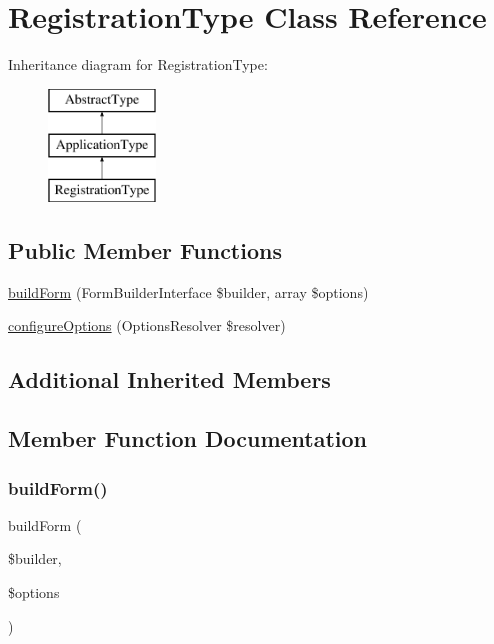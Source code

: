 \hypertarget{class_app_1_1_form_1_1_registration_type}{}\section{Registration\+Type Class Reference}
\label{class_app_1_1_form_1_1_registration_type}
Inheritance diagram for Registration\+Type\+:\begin{figure}[H]
\begin{center}
\leavevmode
\includegraphics[height=3.000000cm]{class_app_1_1_form_1_1_registration_type}
\end{center}
\end{figure}
\subsection*{Public Member Functions}
\begin{DoxyCompactItemize}
\item 
\mbox{\hyperlink{class_app_1_1_form_1_1_registration_type_a83c3745710374f9c5a1eb0686fe2dfab}{build\+Form}} (Form\+Builder\+Interface \$builder, array \$options)
\item 
\mbox{\hyperlink{class_app_1_1_form_1_1_registration_type_a8ff68a86f5090b5df973286836e46ead}{configure\+Options}} (Options\+Resolver \$resolver)
\end{DoxyCompactItemize}
\subsection*{Additional Inherited Members}


\subsection{Member Function Documentation}
\mbox{\label{class_app_1_1_form_1_1_registration_type_a83c3745710374f9c5a1eb0686fe2dfab}} 
\subsubsection{\texorpdfstring{buildForm()}{buildForm()}}
{\footnotesize\ttfamily build\+Form (\begin{DoxyParamCaption}\item[{Form\+Builder\+Interface}]{\$builder,  }\item[{array}]{\$options }\end{DoxyParamCaption})}

